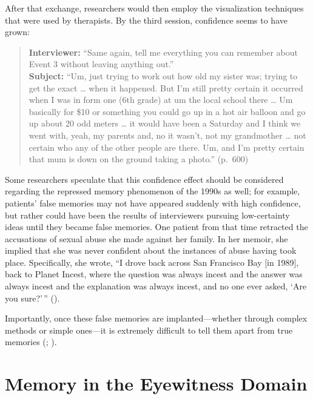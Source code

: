\documentclass[
]{krantz}
\begin{document}
After that exchange, researchers would then employ the visualization techniques that were used by therapists. By the third session, confidence seems to have grown:

\begin{quote}
\textbf{Interviewer:} ``Same again, tell me everything you can remember about Event 3 without leaving anything out.''\\
\textbf{Subject:} ``Um, just trying to work out how old my sister was; trying to get the exact \ldots{} when it happened. But I'm still pretty certain it occurred when I was in form one (6th grade) at um the local school there \ldots{} Um basically for \$10 or something you could go up in a hot air balloon and go up about 20 odd meters \ldots{} it would have been a Saturday and I think we went with, yeah, my parents and, no it wasn't, not my grandmother \ldots{} not certain who any of the other people are there. Um, and I'm pretty certain that mum is down on the ground taking a photo.'' (p.~600)
\end{quote}

Some researchers speculate that this confidence effect should be considered regarding the repressed memory phenomenon of the 1990s as well; for example, patients' false memories may not have appeared suddenly with high confidence, but rather could have been the results of interviewers pursuing low-certainty ideas until they became false memories. One patient from that time retracted the accusations of sexual abuse she made against her family. In her memoir, she implied that she was never confident about the instances of abuse having took place. Specifically, she wrote, ``I drove back across San Francisco Bay {[}in 1989{]}, back to Planet Incest, where the question was always incest and the answer was always incest and the explanation was always incest, and no one ever asked, `Are you sure?'\,'' ().

Importantly, once these false memories are implanted---whether through complex methods or simple ones---it is extremely difficult to tell them apart from true memories (; ).

\section{Memory in the Eyewitness Domain}\label{memory-in-the-eyewitness-domain}
\end{document}
